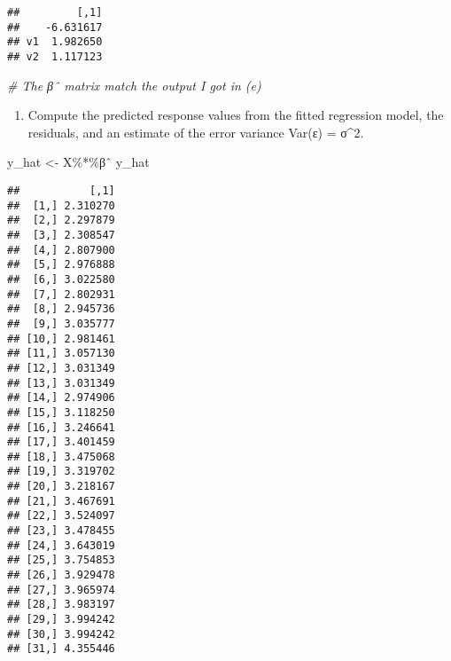 \documentclass[
]{article}
\newenvironment{Shaded}{\begin{snugshade}}{\end{snugshade}}
\newcommand{\AttributeTok}[1]{\textcolor[rgb]{0.77,0.63,0.00}{#1}}
\newcommand{\CommentTok}[1]{\textcolor[rgb]{0.56,0.35,0.01}{\textit{#1}}}
\newcommand{\DecValTok}[1]{\textcolor[rgb]{0.00,0.00,0.81}{#1}}
\newcommand{\FunctionTok}[1]{\textcolor[rgb]{0.00,0.00,0.00}{#1}}
\newcommand{\NormalTok}[1]{#1}
\newcommand{\OtherTok}[1]{\textcolor[rgb]{0.56,0.35,0.01}{#1}}
\newcommand{\SpecialCharTok}[1]{\textcolor[rgb]{0.00,0.00,0.00}{#1}}
\providecommand{\tightlist}{%
  \setlength{\itemsep}{0pt}\setlength{\parskip}{0pt}}
\begin{document}
\begin{Shaded}
\end{Shaded}

\begin{verbatim}
##         [,1]
##    -6.631617
## v1  1.982650
## v2  1.117123
\end{verbatim}

\begin{Shaded}
\begin{Highlighting}[]
\CommentTok{\# The βˆ matrix match the output I got in (e)}
\end{Highlighting}
\end{Shaded}

\begin{enumerate}
\def\labelenumi{(\alph{enumi})}
\setcounter{enumi}{6}
\tightlist
\item
  Compute the predicted response values from the fitted regression
  model, the residuals, and an estimate of the error variance Var(ε) =
  σ\^{}2.
\end{enumerate}

\begin{Shaded}
\begin{Highlighting}[]
\NormalTok{y\_hat }\OtherTok{\textless{}{-}}\NormalTok{ X}\SpecialCharTok{\%*\%}\NormalTok{βˆ}
\NormalTok{y\_hat}
\end{Highlighting}
\end{Shaded}

\begin{verbatim}
##           [,1]
##  [1,] 2.310270
##  [2,] 2.297879
##  [3,] 2.308547
##  [4,] 2.807900
##  [5,] 2.976888
##  [6,] 3.022580
##  [7,] 2.802931
##  [8,] 2.945736
##  [9,] 3.035777
## [10,] 2.981461
## [11,] 3.057130
## [12,] 3.031349
## [13,] 3.031349
## [14,] 2.974906
## [15,] 3.118250
## [16,] 3.246641
## [17,] 3.401459
## [18,] 3.475068
## [19,] 3.319702
## [20,] 3.218167
## [21,] 3.467691
## [22,] 3.524097
## [23,] 3.478455
## [24,] 3.643019
## [25,] 3.754853
## [26,] 3.929478
## [27,] 3.965974
## [28,] 3.983197
## [29,] 3.994242
## [30,] 3.994242
## [31,] 4.355446
\end{verbatim}
\end{document}
